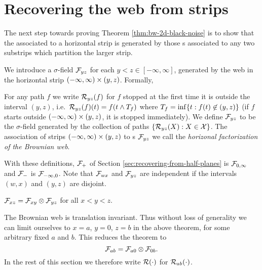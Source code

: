 {
\section{Recovering the web from strips}
\label{sec:recovering-from-strips}

The next step towards proving Theorem \ref{thm:bw-2d-black-noise} is
to show that the \sigfield{} associated to a horizontal strip is
generated by those \sigfield{}s associated to any two substrips
which partition the larger strip.


\newcommand{\strip}{(-\infty, \infty) \cross (y,z)}

We introduce a $\sigma$-field $\mathcal{F}_{y z}$ for each $y < z \in
[-\infty, \infty]$, generated by the web in the horizontal strip
$\strip$.  Formally,

\begin{definition}
  \newcommand{\T}{\stripleavetime{f}}
  \label{def:restrict}
  For any path $f$ we write $\mathcal{R}_{{y}{z}}(f)$ for $f$ stopped at
  the first time it is outside the interval $(y,z)$,
  i.e.\ $\restrict{y}{z}{f}(t) = f(t \minsym \T)$ where $\T = \inf\{ t
  : f(t) \not\in (y,z) \}$ (if $f$ starts
  outside $\strip$, it is stopped immediately).  We define
  $\mathcal{F}_{y z}$ to be the $\sigma$-field generated by the collection
  of paths $\{\mathcal{R}_{{y}{z}}(X) : X \in \mathcal{X} \}$.
  \label{def:horizontal-factorization}
  The association of strips $\strip$ to \sigfield{}s $\mathcal{F}_{y z}$ we call
  the \emph{horizonal factorization of the Brownian web}.
\end{definition}

With these definitions, $\mathcal{F}_{+}$ of Section \ref{sec:recovering-from-half-planes} is
$\mathcal{F}_{0,\infty}$ and $\mathcal{F}_{-}$ is
$\mathcal{F}_{-\infty,0}$.
Note that
  $\mathcal{F}_{w x}$ and $\mathcal{F}_{y z}$ are independent if the
  intervals $(w,x)$ and $(y,z)$ are disjoint.

\renewcommand{\top}{b}
\newcommand{\bottom}{a}

\begin{theorem}\label{thm:recoveringfromstrips}
  $\mathcal{F}_{x z} = \mathcal{F}_{x y} \otimes \mathcal{F}_{y z}$ for all $x < y < z$.
\end{theorem}

The Brownian web is translation invariant.  Thus without loss of
generality we can limit ourselves to $x=a$, $y=0$, $z=b$ in the above
theorem, for some arbitrary fixed $a$ and $b$.  This reduces the theorem to
\[
\mathcal{F}_{a b} = \mathcal{F}_{a 0} \otimes \mathcal{F}_{0 b}.
\]
In the rest of this
section we therefore write $\mathcal{R}(\cdot)$ for
$\restrict{\bottom}{\top}{\cdot}$.

}
